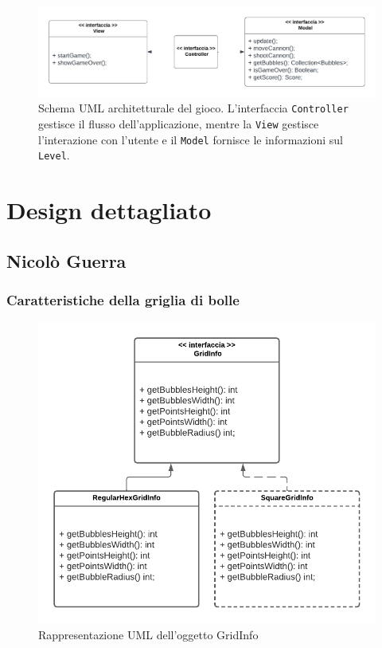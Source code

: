 \documentclass[a4paper,12pt]{report}
\begin{document}
\begin{figure}[h]
	\centering{}
	\includegraphics[width=\textwidth]{img/arch.pdf}
	\caption{Schema UML architetturale del gioco. L'interfaccia \texttt{Controller} gestisce il flusso dell'applicazione, mentre la \texttt{View} gestisce l'interazione con l'utente e il \texttt{Model} fornisce le informazioni sul \texttt{Level}.}
\end{figure}
\section{Design dettagliato}
\subsection{Nicolò Guerra}
\subsubsection{Caratteristiche della griglia di bolle}

\begin{figure}[H]
	\centering{}
	\includegraphics[width=\textwidth]{img/strategy_gridinfo.pdf}
	\caption{Rappresentazione UML dell'oggetto GridInfo}
\end{figure}
\end{document}
